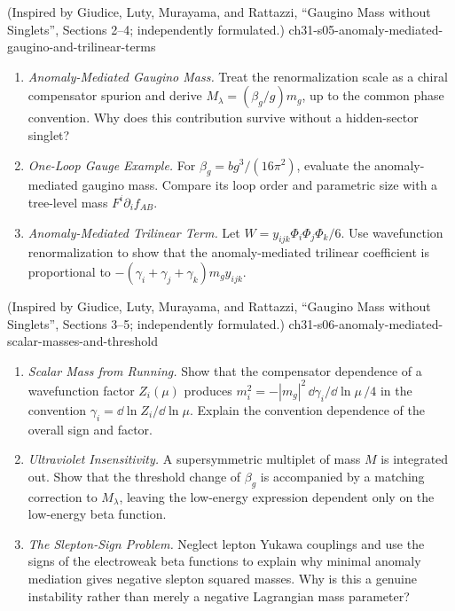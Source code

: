 \begin{enumerate}
    {(Inspired by Giudice, Luty, Murayama, and Rattazzi, ``Gaugino Mass without Singlets'', Sections 2--4; independently formulated.)}
    {ch31-s05-anomaly-mediated-gaugino-and-trilinear-terms}
  \begin{enumerate}
    \item \emph{Anomaly-Mediated Gaugino Mass.}
    Treat the renormalization scale as a chiral compensator spurion and
      derive
      \(M_\lambda=(\beta_g/g)m_g\), up to the common phase convention.
      Why does this contribution survive without a hidden-sector singlet?
    \item \emph{One-Loop Gauge Example.}
    For \(\beta_g=bg^3/(16\pi^2)\), evaluate the anomaly-mediated
      gaugino mass.  Compare its loop order and parametric size with a
      tree-level mass \(F^i\partial_i f_{AB}\).
    \item \emph{Anomaly-Mediated Trilinear Term.}
    Let \(W=y_{ijk}\Phi_i\Phi_j\Phi_k/6\).  Use wavefunction
      renormalization to show that the anomaly-mediated trilinear
      coefficient is proportional to
      \(-(\gamma_i+\gamma_j+\gamma_k)m_g y_{ijk}\).
  \end{enumerate}

    {(Inspired by Giudice, Luty, Murayama, and Rattazzi, ``Gaugino Mass without Singlets'', Sections 3--5; independently formulated.)}
    {ch31-s06-anomaly-mediated-scalar-masses-and-threshold}
  \begin{enumerate}
    \item \emph{Scalar Mass from Running.}
    Show that the compensator dependence of a wavefunction factor
      \(Z_i(\mu)\) produces
      \(m_i^2=-|m_g|^2\,\dd\gamma_i/\dd\ln\mu\,/4\) in the convention
      \(\gamma_i=\dd\ln Z_i/\dd\ln\mu\).  Explain the convention dependence of
      the overall sign and factor.
    \item \emph{Ultraviolet Insensitivity.}
    A supersymmetric multiplet of mass \(M\) is integrated out.  Show that
      the threshold change of \(\beta_g\) is accompanied by a matching
      correction to \(M_\lambda\), leaving the low-energy expression
      dependent only on the low-energy beta function.
    \item \emph{The Slepton-Sign Problem.}
    Neglect lepton Yukawa couplings and use the signs of the electroweak
      beta functions to explain why minimal anomaly mediation gives
      negative slepton squared masses.  Why is this a genuine instability
      rather than merely a negative Lagrangian mass parameter?
  \end{enumerate}


\end{enumerate}
